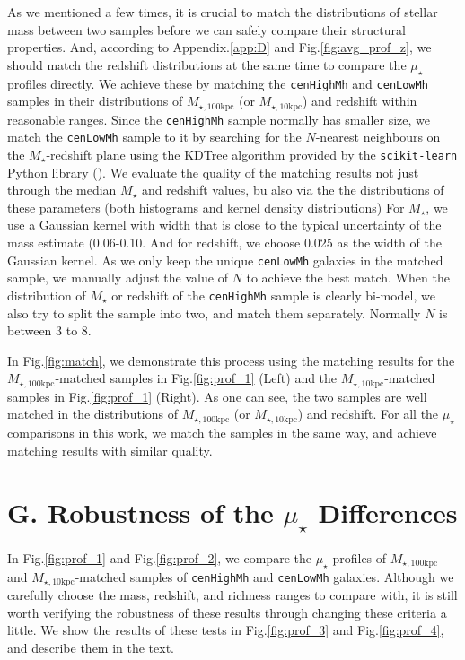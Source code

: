 \documentclass{emulateapj}
\def\rbcg{\texttt{cenHighMh}}
\def\nbcg{\texttt{cenLowMh}}
\def\mstar{{$M_{\star}$}}
\def\minn{{$M_{\star,10\mathrm{kpc}}$}}
\def\mtot{{$M_{\star,100\mathrm{kpc}}$}}
\def\mden{{$\mu_{\star}$}}
\newcommand{\update}[1]{\textcolor{Bittersweet}{#1}}
\begin{document}
\begin{CJK*}{UTF8}{gbsn}
    \update{
    As we mentioned a few times, it is crucial to match the distributions of stellar 
    mass between two samples before we can safely compare their structural properties.
    And, according to Appendix.\ref{app:D} and Fig.\ref{fig:avg_prof_z}, we should match 
    the redshift distributions at the same time to compare the \mden{} profiles directly.
    We achieve these by matching the \rbcg{} and \nbcg{} samples in their distributions 
    of \mtot{} (or \minn{}) and redshift within reasonable ranges.  
    Since the \rbcg{} sample normally has smaller size, we match the \nbcg{} sample to it 
    by searching for the $N$-nearest neighbours on the $M_{\star}$-redshift plane 
    using the KDTree algorithm provided by the \texttt{scikit-learn} Python library 
    (\citealt{scikit-learn}). 
    We evaluate the quality of the matching results not just through the median \mstar{}
    and redshift values, bu also via the the distributions of these parameters 
    (both histograms and kernel density distributions) 
    For \mstar{}, we use a Gaussian kernel with width that is close to the typical 
    uncertainty of the mass estimate (0.06-0.10.
    And for redshift, we choose 0.025 as the width of the Gaussian kernel. 
    As we only keep the unique \nbcg{} galaxies in the matched sample, we manually 
    adjust the value of $N$ to achieve the best match. 
    When the distribution of \mstar{} or redshift of the \rbcg{} sample is clearly
    bi-model, we also try to split the sample into two, and match them separately.
    Normally $N$ is between 3 to 8.
    }
    
    \update{
    In Fig.\ref{fig:match}, we demonstrate this process using the matching results for 
    the \mtot{}-matched samples in Fig.\ref{fig:prof_1} (Left) and the \minn{}-matched 
    samples in Fig.\ref{fig:prof_1} (Right). 
    As one can see, the two samples are well matched in the distributions of \mtot{}
    (or \minn{}) and redshift.  
    For all the \mden{} comparisons in this work, we match the samples in the same 
    way, and achieve matching results with similar quality. 
    }
    
\section{G. Robustness of the \mden{} Differences} 
	\label{app:robust}
    
    \update{
    In Fig.\ref{fig:prof_1} and Fig.\ref{fig:prof_2}, we compare the \mden{} profiles of 
    \mtot{}- and \minn{}-matched samples of \rbcg{} and \nbcg{} galaxies. 
    Although we carefully choose the mass, redshift, and richness ranges to compare with, 
    it is still worth verifying the robustness of these results through changing these 
    criteria a little. 
    We show the results of these tests in Fig.\ref{fig:prof_3} and Fig.\ref{fig:prof_4}, 
    and describe them in the text. 
    }
    

\end{CJK*}
\end{document}
